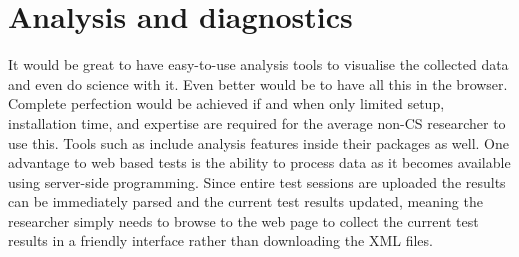 \documentclass{sig-alternate}
\begin{document}
	
\begin{comment}
{	\bf A screenshot would be nice. 

	Established tests (see below) included as `presets' in the build-your-own-test page. }
\end{comment}

\section{Analysis and diagnostics}
	It would be great to have easy-to-use analysis tools to visualise the collected data and even do science with it. Even better would be to have all this in the browser. Complete perfection would be achieved if and when only limited setup, installation time, and expertise are required for the average non-CS researcher to use this. Tools such as \cite{scale} include analysis features inside their packages as well.
	One advantage to web based tests is the ability to process data as it becomes available using server-side programming. Since entire test sessions are uploaded the results can be immediately parsed and the current test results updated, meaning the researcher simply needs to browse to the web page to collect the current test results in a friendly interface rather than downloading the XML files.
	
\end{document}
